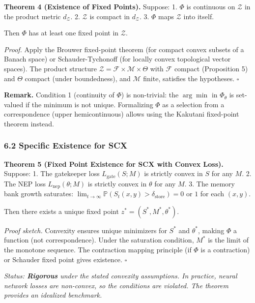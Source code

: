 \documentclass[
  12pt,
]{ctexart}
\begin{document}
\textbf{Theorem 4 (Existence of Fixed Points).} Suppose: 1. \(\Phi\) is
continuous on \(\mathcal{Z}\) in the product metric \(d_{\mathcal{Z}}\).
2. \(\mathcal{Z}\) is compact in \(d_{\mathcal{Z}}\). 3. \(\Phi\) maps
\(\mathcal{Z}\) into itself.

Then \(\Phi\) has at least one fixed point in \(\mathcal{Z}\).

\emph{Proof.} Apply the Brouwer fixed-point theorem (for compact convex
subsets of a Banach space) or Schauder-Tychonoff (for locally convex
topological vector spaces). The product structure
\(\mathcal{Z} = \mathcal{F} \times \mathcal{M} \times \Theta\) with
\(\mathcal{F}\) compact (Proposition 5) and \(\Theta\) compact (under
boundedness), and \(\mathcal{M}\) finite, satisfies the hypotheses.
\(\square\)

\textbf{Remark.} Condition 1 (continuity of \(\Phi\)) is non-trivial:
the \(\arg\min\) in \(\Phi_\theta\) is set-valued if the minimum is not
unique. Formalizing \(\Phi\) as a selection from a correspondence (upper
hemicontinuous) allows using the Kakutani fixed-point theorem instead.

\subsubsection{6.2 Specific Existence for
SCX}\label{specific-existence-for-scx}

\textbf{Theorem 5 (Fixed Point Existence for SCX with Convex Loss).}
Suppose: 1. The gatekeeper loss \(L_{\text{gate}}(S; M)\) is strictly
convex in \(S\) for any \(M\). 2. The NEP loss
\(L_{\text{nep}}(\theta; M)\) is strictly convex in \(\theta\) for any
\(M\). 3. The memory bank growth saturates:
\(\lim_{t\to\infty} \mathbb{P}(S_t(x,y) > \delta_{\text{store}}) = 0\)
or \(1\) for each \((x,y)\).

Then there exists a unique fixed point \(z^* = (S^*, M^*, \theta^*)\).

\emph{Proof sketch.} Convexity ensures unique minimizers for \(S^*\) and
\(\theta^*\), making \(\Phi\) a function (not correspondence). Under the
saturation condition, \(M^*\) is the limit of the monotone sequence. The
contraction mapping principle (if \(\Phi\) is a contraction) or Schauder
fixed point gives existence. \(\square\)

\emph{Status: \textbf{Rigorous} under the stated convexity assumptions.
In practice, neural network losses are non-convex, so the conditions are
violated. The theorem provides an idealized benchmark.}
\end{document}
